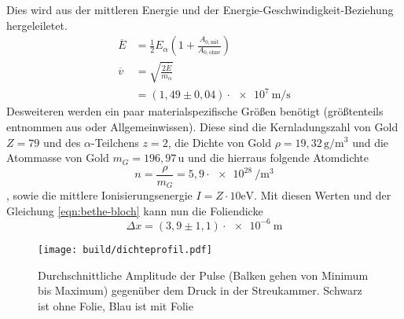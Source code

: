 Dies wird aus der mittleren Energie und der Energie-Geschwindigkeit-Beziehung hergeleiletet.
\begin{align}
  \overline{E} &= \frac{1}{2} E_{\alpha}\left(1 + \frac{A_{0,\text{mit}}}{A_{0,\text{ohne}}} \right)\\
  \overline{v} &= \sqrt{\frac{2\overline{E}}{m_{\alpha}}}\\
               &= (1,49 \pm 0,04)\cdot\SI{e+7}{\meter\per\second}
\end{align}
Desweiteren werden ein paar materialspezifische Größen benötigt (größtenteils entnommen aus \cite{Gold} oder Allgemeinwissen).
Diese sind die Kernladungszahl von Gold $Z=79$ und des $\alpha$-Teilchens $z=2$, die Dichte von Gold $\rho=19,32\, \si{\gram\per\meter\cubed}$
und die Atommasse von Gold $m_G=196,97\,\text{u}$ und die hierraus folgende Atomdichte
\begin{equation}
  n=\frac{\rho}{m_G}=5,9\cdot\SI{e+28}{\per\meter\cubed}
\end{equation}
, sowie die mittlere Ionisierungsenergie $I=Z\cdot 10\si{\electronvolt}$.
Mit diesen Werten und der Gleichung \eqref{eqn:bethe-bloch} kann nun die Foliendicke
\begin{equation}
  \Delta x = (3,9 \pm 1,1)\cdot\SI{e-6}{\meter}
\end{equation}

\begin{figure}
  \centering
  \texttt{[image: build/dichteprofil.pdf]}
  \caption{Durchschnittliche Amplitude der Pulse (Balken gehen von Minimum bis Maximum) gegenüber dem Druck in der Streukammer. Schwarz ist ohne Folie, Blau ist mit Folie}
  \label{fig:dichteprofil}
\end{figure}

